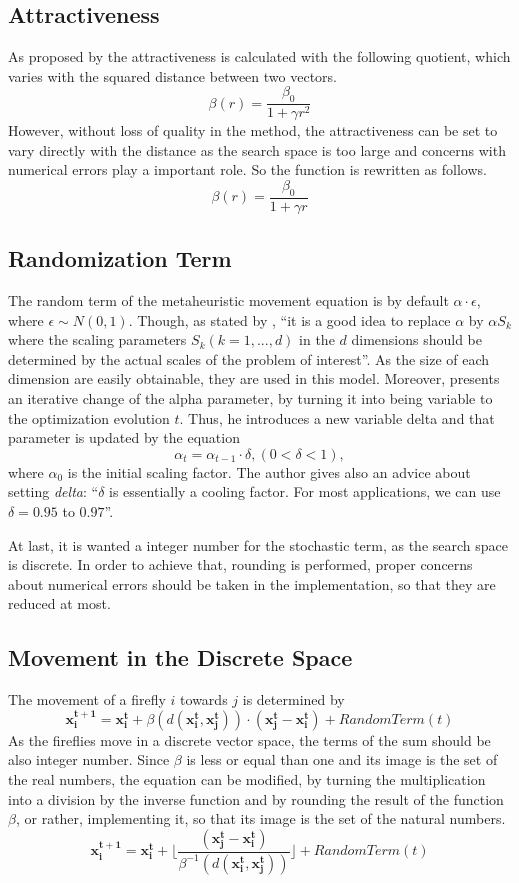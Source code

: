 \documentclass[tuberlin,cic,tc,openright,english,noabntcite,oneside]{iiufrgs}
\begin{document}
\subsection{Attractiveness}
As proposed by \textcite[p. 173]{yang_firefly_2009} the attractiveness is calculated with the following quotient, which varies with the squared distance between two vectors.
$$\beta(r) = \frac{\beta_{0}}{1 + \gamma r^2}$$
However, without loss of quality in the method, the attractiveness can be set to vary directly with the distance as the search space is too large and concerns with numerical errors play a important role. So the function is rewritten as follows.
$$\beta(r) = \frac{\beta_{0}}{1 + \gamma r}$$

\subsection{Randomization Term}
The random term of the metaheuristic movement equation is by default $\alpha \cdot \epsilon$, where $\epsilon \sim N(0,1)$. Though, as stated by \textcite[p. 80]{yang_firefly_2010}, \enquote{it is a good idea to replace $\alpha$ by $\alpha S_k$ where the scaling parameters $S_k (k=1,...,d)$ in the $d$ dimensions should be determined by the actual scales of the problem of interest}. As the size of each dimension are easily obtainable, they are used in this model. Moreover, \textcite[p. 37-38]{yang_firefly_2013} presents an iterative change of the alpha parameter, by turning it into being variable to the optimization evolution $t$. Thus, he introduces a new variable delta and that parameter is updated by the equation
$$ \alpha_t = \alpha_{t-1} \cdot \delta, (0 < \delta < 1),$$ where $\alpha_0$ is the initial scaling factor. The author gives also an advice about setting \emph{delta}: \enquote{$\delta$ is essentially a cooling factor. For most applications, we can use $\delta = 0.95$ to $0.97$}.

At last, it is wanted a integer number for the stochastic term, as the search space is discrete. In order to achieve that, rounding is performed, proper concerns about numerical errors should be taken in the implementation, so that they are reduced at most.

\subsection{Movement in the Discrete Space}
The movement of a firefly $i$ towards $j$ is determined by $$\mathbf{x^{t+1}_i} = \mathbf{x^{t}_i} + \beta(d(\mathbf{x^{t}_i}, \mathbf{x^{t}_j})) \cdot (\mathbf{x^{t}_j} - \mathbf{x^{t}_i}) + RandomTerm(t)$$
As the fireflies move in a discrete vector space, the terms of the sum should be also integer number. Since $\beta$ is less or equal than one and its image is the set of the real numbers, the equation can be modified, by turning the multiplication into a division by the inverse function and by rounding the result of the function $\beta$, or rather, implementing it, so that its image is the set of the natural numbers.
$$\mathbf{x^{t+1}_i} = \mathbf{x^{t}_i} +  \lfloor \frac{(\mathbf{x^{t}_j} - \mathbf{x^{t}_i})}{\beta^{-1}(d(\mathbf{x^{t}_i}, \mathbf{x^{t}_j}))} \rfloor + RandomTerm(t)$$
\end{document}
